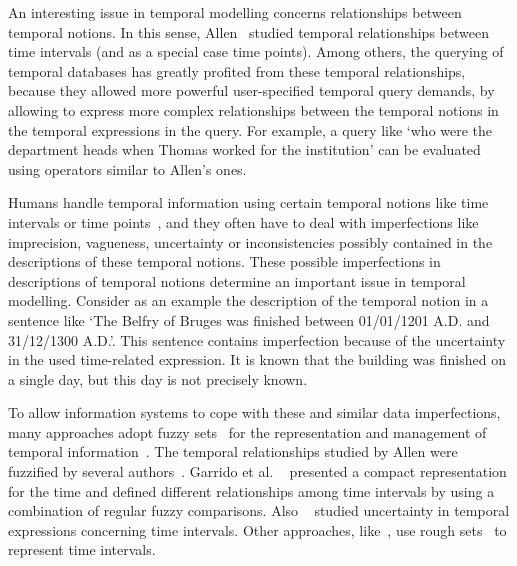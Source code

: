 An interesting issue in temporal modelling concerns relationships between temporal notions. In this sense, Allen~\cite{Allen1983} studied temporal relationships between time intervals (and as a special case time points). Among others, the querying of temporal databases has greatly profited from these temporal relationships, because they allowed more powerful user-specified temporal query demands, by allowing to express more complex relationships between the temporal notions in the temporal expressions in the query. For example, a query like `who were the department heads when Thomas worked for the institution' can be evaluated using operators similar to Allen's ones.

Humans handle temporal information using certain temporal notions like time intervals or time points~\cite{Dyreson1994}, and they often have to deal with imperfections like imprecision, vagueness, uncertainty or inconsistencies possibly contained in the descriptions of these temporal notions. These possible imperfections in descriptions of temporal notions determine an important issue in temporal modelling. Consider as an example the description of the temporal notion in a sentence like `The Belfry of Bruges was finished between 01/01/1201 A.D. and 31/12/1300 A.D.'. This sentence contains imperfection because of the uncertainty in the used time-related expression. It is known that the building was finished on a single day, but this day is not precisely known.

To allow information systems to cope with these and similar data imperfections, many approaches adopt fuzzy sets~\cite{Zadeh1965} for the representation and management of temporal information~\cite{Mitra1994,Nagypal2003,Billiet2011,Dubois2003}. The temporal relationships studied by Allen were fuzzified by several authors~\cite{Ohlbach2004,Nagypal2003,Schockaert2008}.   Garrido et al. ~\cite{Garrido2009} presented a compact representation for the time and defined different relationships among time intervals by using a combination of regular fuzzy comparisons. Also ~\cite{Garrido2009,Pons2011} studied uncertainty in temporal expressions concerning time intervals. Other approaches, like~\cite{Qiang2009}, use rough sets~\cite{Pawlak1995} to represent time intervals.

